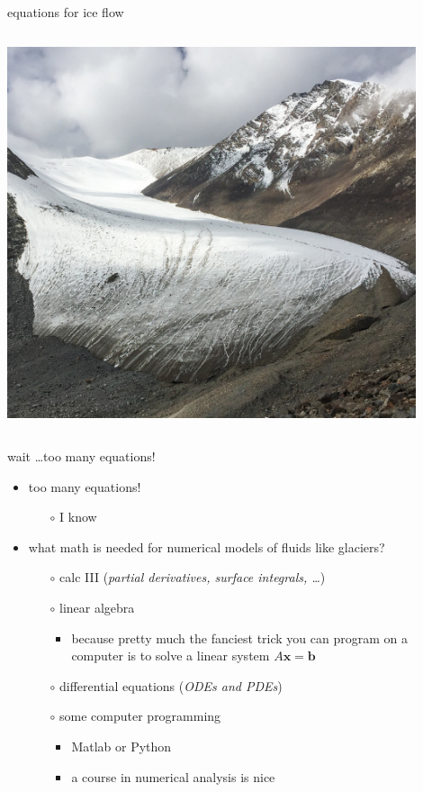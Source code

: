 \documentclass[hide notes,intlimits]{beamer}
\newcommand{\bb}{\mathbf{b}}
\newcommand{\bx}{\mathbf{x}}
\begin{document}
\begin{frame}{equations for ice flow}
\begin{columns}
\begin{column}{0.35\textwidth}
\hfill\includegraphics[width=0.9\textwidth]{xinjiangglacier}
\end{column}
\end{columns}
\end{frame}


\begin{frame}{wait \dots too many equations!}

\begin{itemize}
\item too many equations!
    \begin{itemize}
    \item[$\circ$] I know
    \end{itemize}
\item what math is needed for numerical models of fluids like glaciers?
    \begin{itemize}
    \item[$\circ$] calc III \hfill (\emph{partial derivatives, surface integrals, \dots})
    \item[$\circ$] linear algebra
        \begin{itemize}
        \item because pretty much the fanciest trick you can program on a computer is to solve a linear system $A\bx = \bb$
        \end{itemize}
    \item[$\circ$] differential equations \hfill (\emph{ODEs \emph{and} PDEs})
    \item[$\circ$] some computer programming
        \begin{itemize}
        \item Matlab or Python
        \item a course in numerical analysis is nice
        \end{itemize}
    \end{itemize}
\end{itemize}
\end{frame}
\end{document}
